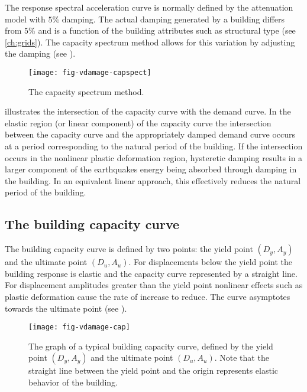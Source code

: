 The response spectral acceleration curve is normally defined by the attenuation model
with $5\%$ damping.  The actual damping generated by a building
differs from $5\%$ and is a function of the building attributes
such as structural type (see \cref{ch:grids}). The capacity
spectrum method allows for this
variation by adjusting the damping (see
).

\begin{figure}[htp]
\centering {}
 
\texttt{[image: fig-vdamage-capspect]}
\caption{The capacity spectrum method.} \label{fig:vdamage-capspect}
\end{figure}


 illustrates the intersection of the
capacity curve with the demand
curve.  In the elastic region (or linear
component) of the capacity curve the
intersection between the capacity curve and
the appropriately damped demand curve occurs
at a period corresponding to the natural period of the building.
If the intersection occurs in the nonlinear plastic deformation
region, hysteretic damping results in a larger component of the
earthquakes energy being absorbed through damping in the building.
In an equivalent linear approach, this effectively reduces the
natural period of the building.


\subsection{The building capacity curve}

The building capacity curve is defined by two points:
the yield point $(D_y, A_y)$ and the ultimate point $(D_u, A_u)$.
For displacements below the yield point the building response is
elastic and the capacity curve represented
by a straight line. For displacement amplitudes greater than the
yield point nonlinear effects such as plastic deformation cause
the rate of increase to reduce. The curve asymptotes towards the
ultimate point (see ).

\begin{figure}[htp]
\centering
{}
\texttt{[image: fig-vdamage-cap]}
\caption{The graph of a typical building capacity
curve, defined by
  the yield point $(D_y, A_y)$ and the ultimate point $(D_u, A_u)$.
  Note that the straight line between the yield point and the origin
  represents elastic behavior of the building. }
\label{fig:vdamage-cap}
\end{figure}


